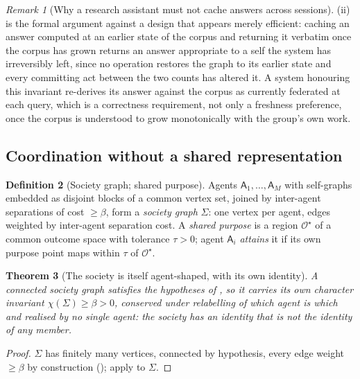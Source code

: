 \documentclass[11pt,twocolumn,a4paper]{article}
\theoremstyle{frathm}
\newtheorem{theorem}{Theorem}[section]
\theoremstyle{definition}
\newtheorem{definition}[theorem]{Definition}
\theoremstyle{remark}
\newtheorem{remark}[theorem]{Remark}
\newcommand{\flo}{\beta}
\newcommand{\Char}{\chi}
\newcommand{\Soc}{\Sigma}
\newcommand{\Out}{\mathcal{O}}
\begin{document}
\begin{remark}[Why a research assistant must not cache answers across
sessions]
\label{rem:no-cache}
(ii) is the formal argument against a design that
appears merely efficient: caching an answer computed at an earlier state
of the corpus and returning it verbatim once the corpus has grown returns
an answer appropriate to a self the system has irreversibly left, since
no operation restores the graph to its earlier state and every
committing act between the two counts has altered it. A system
honouring this invariant re-derives its answer
against the corpus as currently federated at each query, which is a
correctness requirement, not only a freshness preference, once the corpus
is understood to grow monotonically with the group's own work.
\end{remark}

\subsection{Coordination without a shared representation}

\begin{definition}[Society graph; shared purpose]
\label{def:society}
Agents $\mathsf{A}_1,\dots,\mathsf{A}_M$ with self-graphs embedded as
disjoint blocks of a common vertex set, joined by inter-agent
separations of cost $\ge\flo$, form a \emph{society graph} $\Soc$: one
vertex per agent, edges weighted by inter-agent separation cost. A
\emph{shared purpose} is a region $\Out^{\star}$ of a common outcome
space with tolerance $\tau>0$; agent $\mathsf{A}_i$ \emph{attains} it if
its own purpose point maps within $\tau$ of $\Out^{\star}$.
\end{definition}

\begin{theorem}[The society is itself agent-shaped, with its own
identity]
\label{thm:society-identity}
A connected society graph satisfies the hypotheses of
, so it carries its own character invariant
$\Char(\Soc)\ge\flo>0$, conserved under relabelling of which agent is
which and realised by no single agent: the society has an identity that
is not the identity of any member.
\end{theorem}

\begin{proof}
$\Soc$ has finitely many vertices, connected by hypothesis, every edge
weight $\ge\flo$ by construction (); apply
 to $\Soc$.
\end{proof}
\end{document}
